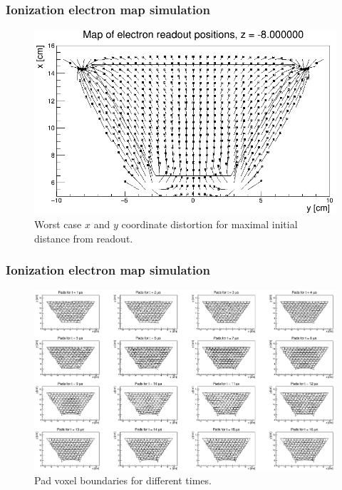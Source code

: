 \documentclass{beamer}
\begin{document}
	\begin{frame}
		\frametitle{Ionization electron map simulation}
		\centering
		\begin{minipage}[c]{0.9\textwidth}
			\begin{figure}
				\centering
				\includegraphics[height=0.7\textheight]{../images/map_dist2_new.png}\\
				\small{Worst case $x$ and $y$ coordinate distortion for maximal initial distance from readout.}
			\end{figure}
		\end{minipage}
	\end{frame}
	\begin{frame}
		\frametitle{Ionization electron map simulation}
		\begin{figure}
			\centering
			\includegraphics[height=0.68\textheight]{../images/pads_distortion.png}\\
			{Pad voxel boundaries for different times.}
		\end{figure}
	\end{frame}
\end{document}
